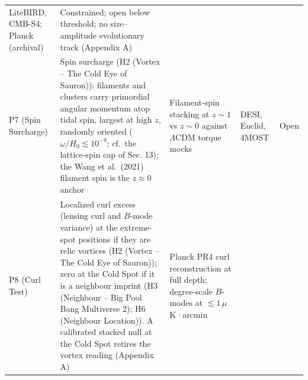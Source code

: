 \documentclass[
  11pt,
]{article}
\begin{document}
\begin{longtable}[]{@{}lllll@{}}
\begin{minipage}[t]{0.19\columnwidth}
LiteBIRD, CMB-S4; Planck (archival)\strut
\end{minipage} & \begin{minipage}[t]{0.19\columnwidth}\raggedright
Constrained; open below threshold; no size--amplitude evolutionary track
(Appendix A)\strut
\end{minipage}\tabularnewline
\begin{minipage}[t]{0.11\columnwidth}\raggedright
P7 (Spin Surcharge)\strut
\end{minipage} & \begin{minipage}[t]{0.19\columnwidth}\raggedright
Spin surcharge (H2 (Vortex -- The Cold Eye of Sauron)): filaments and
clusters carry primordial angular momentum atop tidal spin, largest at
high \(z\), randomly oriented (\(\omega/H_0 \lesssim 10^{-9}\); cf.~the
lattice-spin cap of Sec. 13); the Wang et al.~(2021) filament spin is
the \(z \approx 0\) anchor\strut
\end{minipage} & \begin{minipage}[t]{0.19\columnwidth}\raggedright
Filament-spin stacking at \(z \sim 1\) vs \(z \sim 0\) against
\(\Lambda\)CDM torque mocks\strut
\end{minipage} & \begin{minipage}[t]{0.19\columnwidth}\raggedright
DESI, Euclid, 4MOST\strut
\end{minipage} & \begin{minipage}[t]{0.19\columnwidth}\raggedright
Open\strut
\end{minipage}\tabularnewline
\begin{minipage}[t]{0.11\columnwidth}\raggedright
P8 (Curl Test)\strut
\end{minipage} & \begin{minipage}[t]{0.19\columnwidth}\raggedright
Localized curl excess (lensing curl and \(B\)-mode variance) at the
extreme-spot positions if they are relic vortices (H2 (Vortex -- The
Cold Eye of Sauron)); zero at the Cold Spot if it is a neighbour imprint
(H3 (Neighbour -- Big Pool Bang Multiverse 2); H6 (Neighbour Location)).
A calibrated stacked null at the Cold Spot retires the vortex reading
(Appendix A)\strut
\end{minipage} & \begin{minipage}[t]{0.19\columnwidth}\raggedright
Planck PR4 curl reconstruction at full depth; degree-scale \(B\)-modes
at \(\lesssim 1\,\mu\)K·arcmin\strut
\end{minipage} & \begin{minipage}[t]{0.19\columnwidth}\raggedright

\end{minipage}
\end{longtable}
\end{document}
